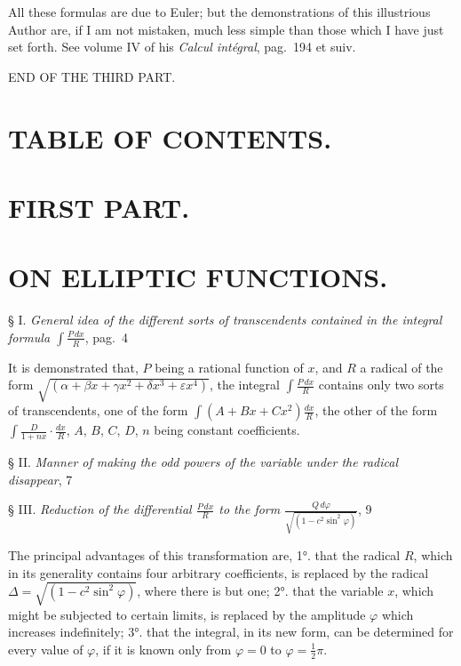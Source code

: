 \documentclass{article}
\begin{document}
All these formulas are due to Euler; but the demonstrations of this illustrious Author are, if I am not mistaken, much less simple than those which I have just set forth. See volume IV of his \emph{Calcul intégral}, pag.~194 et suiv.

END OF THE THIRD PART.


\section*{TABLE OF CONTENTS.}

\section*{FIRST PART.}

\section*{ON ELLIPTIC FUNCTIONS.}

§ I. \emph{General idea of the different sorts of transcendents contained in the integral formula $\displaystyle\int\frac{P\,dx}{R}$}, pag.~4

It is demonstrated that, $P$ being a rational function of $x$, and $R$ a radical of the form $\sqrt{(\alpha+\beta x+\gamma x^{2}+\delta x^{3}+\varepsilon x^{4})}$, the integral $\displaystyle\int\frac{P\,dx}{R}$ contains only two sorts of transcendents, one of the form $\displaystyle\int(A+Bx+Cx^{2})\frac{dx}{R}$, the other of the form $\displaystyle\int\frac{D}{1+nx}\cdot\frac{dx}{R}$, $A$, $B$, $C$, $D$, $n$ being constant coefficients.

§ II. \emph{Manner of making the odd powers of the variable under the radical disappear}, 7

§ III. \emph{Reduction of the differential $\frac{P\,dx}{R}$ to the form $\frac{Q\,d\varphi}{\sqrt{(1-c^{2}\sin^{2}\varphi)}}$}, 9

The principal advantages of this transformation are, 1°. that the radical $R$, which in its generality contains four arbitrary coefficients, is replaced by the radical $\Delta=\sqrt{(1-c^{2}\sin^{2}\varphi)}$, where there is but one; 2°. that the variable $x$, which might be subjected to certain limits, is replaced by the amplitude $\varphi$ which increases indefinitely; 3°. that the integral, in its new form, can be determined for every value of $\varphi$, if it is known only from $\varphi=0$ to $\varphi=\frac{1}{2}\pi$.
\end{document}
